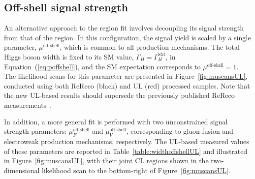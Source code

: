 \subsection{Off-shell signal strength}


An alternative approach to the \offshell region fit involves decoupling its signal strength from that of the \onshell region. In this configuration, the signal yield is scaled by a single parameter, $\mu^\text{off-shell}$, which is common to all production mechanisms. The total Higgs boson width is fixed to its SM value, $\Gamma_H = \Gamma_H^{\mathrm{SM}}$, in Equation~(\ref{eq:poffshell}), and the SM expectation corresponds to $\mu^\text{off-shell} = 1$. The likelihood scans for this parameter are presented in Figure~\ref{fig:muscansUL}, conducted using both ReReco (black) and UL (red) processed samples. Note that the new UL-based results should supersede the previously published ReReco measurements~\cite{PhysRevD.111.092014}.

In addition, a more general fit is performed with two unconstrained signal strength parameters: $\mu^\text{off-shell}_{F}$ and $\mu^\text{off-shell}_{V}$, corresponding to gluon-fusion and electroweak production mechanisms, respectively. The UL-based measured values of these parameters are reported in Table~\ref{table:widthoffshellUL} and illustrated in Figure~\ref{fig:muscansUL}, with their joint CL regions shown in the two-dimensional likelihood scan to the bottom-right of Figure~\ref{fig:muscansUL}. 


